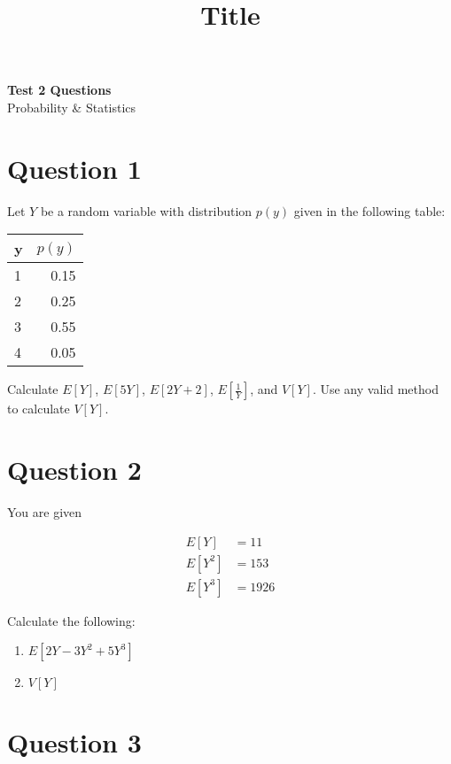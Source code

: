 \documentclass[11pt]{article}
\theoremstyle{definition}
\begin{document}
\title{Title}

\thispagestyle{empty}

\begin{center}
{\LARGE \bf Test 2 Questions} \\
{\large Probability \& Statistics} \\
\end{center}
\section*{Question 1}

Let $Y$ be a random variable with distribution $p(y)$ given in the following table:

\begin{table}[h]
	\centering
	\begin{tabular}{lr}
		\hline
		y & $p(y)$ \\
		\hline
		1 & 0.15 \\
		2 & 0.25 \\
		3 & 0.55 \\
		4 & 0.05 \\
		\hline
	\end{tabular}
\end{table}

\noindent Calculate $E[Y]$, $E[5Y]$, $E[2Y+2]$, $E\left[ \frac{1}{Y} \right]$, and $V[Y]$. Use any valid method to calculate $V[Y]$.

\section*{Question 2}

You are given

$$
	\begin{aligned}
		E[Y] & = 11 \\
		E[Y^2] & = 153 \\
		E[Y^3] & = 1926
	\end{aligned}
$$

\noindent Calculate the following:

\begin{enumerate}
	\item $E[2Y - 3Y^2 + 5Y^3]$
	\item $V[Y]$
\end{enumerate}

\section*{Question 3}
\end{document}
